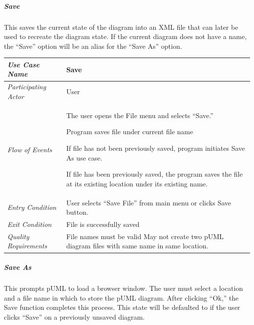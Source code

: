 \documentclass[twoside,letterpaper]{article}
\newenvironment{my_enumerate}{
\begin{enumerate}
  \setlength{\itemsep}{1pt}
  \setlength{\parskip}{0pt}
  \setlength{\parsep}{0pt}}{\end{enumerate}
}
\begin{document}

\subparagraph[\ Save] 
{\bfseries Save }
{ This saves the current state of the diagram into an XML file that can later be used to recreate the diagram state. If the current diagram does not have a name, the ``Save'' option will be an alias for the ``Save As'' option.}

\begin{flushleft}
\tablehead{}
\begin{tabular}{|m{2.0in} m{5.0in}|}
\hline
{\bfseries\emph{Use Case Name}}
& {\bfseries Save}
\\\hline
\emph{Participating Actor}
& User
\\\hline
\emph{Flow of Events}
& \begin{my_enumerate}
  \item The user opens the File menu and selects ``Save.''
  \item Program saves file under current file name 
\begin{my_enumerate}
\item If file has not been previously saved, program initiates Save As use case. 
\item If file has been previously saved, the program saves the file at its existing location under its existing name.
\end{my_enumerate}
\end{my_enumerate}
\\\hline
\emph{Entry Condition}
& User selects ``Save File'' from main menu or clicks Save button.
\\\hline
\emph{Exit Condition}
& File is successfully saved
\\\hline
\emph{Quality Requirements}
& File names must be valid \newline
  May not create two pUML diagram files with same name in same location.
\\\hline
\end{tabular}
\end{flushleft}
\bigskip





\clearpage

\subparagraph[\ Save As ] 
{\bfseries Save As }
{ This prompts pUML to load a browser window. The user must select a location and a file name in which to store the pUML diagram.  After clicking ``Ok,'' the Save function completes this process.  This state will be defaulted to if the user clicks ``Save'' on a previously unsaved diagram.}
\end{document}
